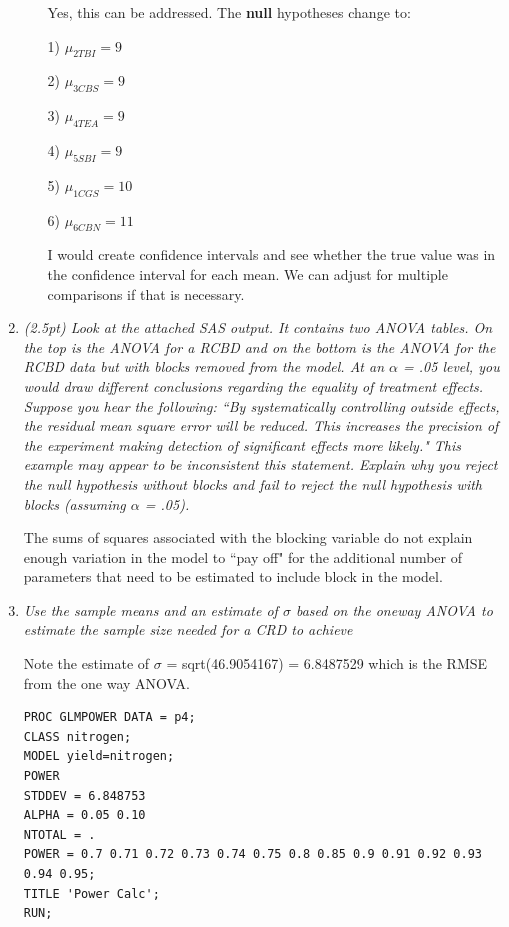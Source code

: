\documentclass{article}\usepackage[]{graphicx}\usepackage[]{color}
\begin{document}
\begin{enumerate}
\begin{enumerate}
Yes, this can be addressed. The {\bf null} hypotheses change to:

1) $\mu_{2TBI} = 9$

2) $\mu_{3CBS} = 9$

3) $\mu_{4TEA} = 9$

4) $\mu_{5SBI} = 9$

5) $\mu_{1CGS} = 10$

6) $\mu_{6CBN} = 11$

I would create confidence intervals and see whether the true value was in the confidence interval for each mean. We can adjust for multiple comparisons if that is necessary.

\end{enumerate}

\item 
{\it  (2.5pt) Look at the attached SAS output. It contains two ANOVA tables. On the top is the ANOVA
for a RCBD and on the bottom is the ANOVA for the RCBD data but with blocks removed from the
model. At an $\alpha$ = .05 level, you would draw different conclusions regarding the equality of treatment effects. Suppose you hear the following: ``By systematically controlling outside effects, the residual mean square error will be reduced.
This increases the precision of the experiment making detection of significant effects
more likely." This example may appear to be inconsistent this statement. Explain why you reject the null hypothesis without blocks and fail to reject the null hypothesis with blocks (assuming $\alpha$ = .05).
}

The sums of squares associated with the blocking variable do not explain enough variation in the model to ``pay off" for the additional number of parameters that need to be estimated to include block in the model.

\item
{\it Use the sample means and an estimate of $\sigma$ based on the oneway ANOVA to estimate the sample
size needed for a CRD to achieve}

Note the estimate of $\sigma$ = sqrt(46.9054167) = 6.8487529 which is the RMSE from the one way ANOVA.

\begin{verbatim}
PROC GLMPOWER DATA = p4;
CLASS nitrogen;
MODEL yield=nitrogen;
POWER
STDDEV = 6.848753
ALPHA = 0.05 0.10
NTOTAL = .
POWER = 0.7 0.71 0.72 0.73 0.74 0.75 0.8 0.85 0.9 0.91 0.92 0.93 0.94 0.95;
TITLE 'Power Calc';
RUN;
\end{verbatim}


\end{enumerate}
\end{document}
